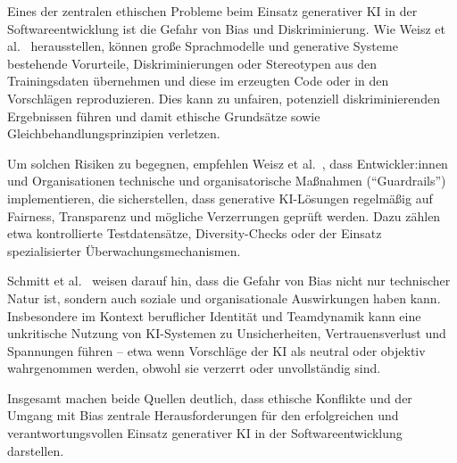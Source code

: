Eines der zentralen ethischen Probleme beim Einsatz generativer KI in der
Softwareentwicklung ist die Gefahr von Bias und Diskriminierung. Wie Weisz et
al.~\cite{weisz_design_2024} herausstellen, können große Sprachmodelle und
generative Systeme bestehende Vorurteile, Diskriminierungen oder Stereotypen
aus den Trainingsdaten übernehmen und diese im erzeugten Code oder in den
Vorschlägen reproduzieren. Dies kann zu unfairen, potenziell diskriminierenden
Ergebnissen führen und damit ethische Grundsätze sowie
Gleichbehandlungsprinzipien verletzen.

Um solchen Risiken zu begegnen, empfehlen Weisz et
al.~\cite{weisz_design_2024}, dass Entwickler:innen und Organisationen
technische und organisatorische Maßnahmen (\enquote{Guardrails})
implementieren, die sicherstellen, dass generative KI-Lösungen regelmäßig auf
Fairness, Transparenz und mögliche Verzerrungen geprüft werden. Dazu zählen
etwa kontrollierte Testdatensätze, Diversity-Checks oder der Einsatz
spezialisierter Überwachungsmechanismen.

Schmitt et al.~\cite{schmitt_generative_2024} weisen darauf hin, dass die
Gefahr von Bias nicht nur technischer Natur ist, sondern auch soziale und
organisationale Auswirkungen haben kann. Insbesondere im Kontext beruflicher
Identität und Teamdynamik kann eine unkritische Nutzung von KI-Systemen zu
Unsicherheiten, Vertrauensverlust und Spannungen führen – etwa wenn Vorschläge
der KI als neutral oder objektiv wahrgenommen werden, obwohl sie verzerrt oder
unvollständig sind.

Insgesamt machen beide Quellen deutlich, dass ethische Konflikte und der Umgang
mit Bias zentrale Herausforderungen für den erfolgreichen und
verantwortungsvollen Einsatz generativer KI in der Softwareentwicklung
darstellen.
